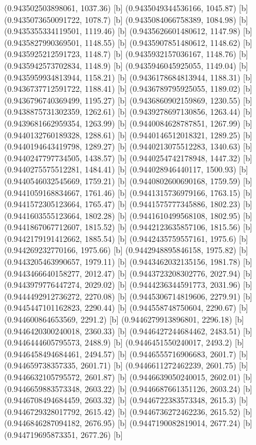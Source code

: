 {{{(0.943502503898061, 1037.36) [b] 
(0.9435049344536166, 1045.87) [b] 
(0.9435073650091722, 1078.7) [b] 
(0.9435084066758389, 1084.98) [b] 
(0.9435355334119501, 1119.46) [b] 
(0.9435626601480612, 1147.98) [b] 
(0.9435827990369501, 1148.55) [b] 
(0.9435907851480612, 1148.62) [b] 
(0.9435925212591723, 1148.7) [b] 
(0.9435932157036167, 1148.76) [b] 
(0.9435942573702834, 1148.9) [b] 
(0.9435946045925055, 1149.04) [b] 
(0.9435959934813944, 1158.21) [b] 
(0.9436178684813944, 1188.31) [b] 
(0.9436737712591722, 1188.41) [b] 
(0.9436789795925055, 1189.02) [b] 
(0.9436796740369499, 1195.27) [b] 
(0.9436860902159869, 1230.55) [b] 
(0.9438875731302359, 1262.61) [b] 
(0.9439278697130856, 1263.44) [b] 
(0.9439681662959354, 1263.99) [b] 
(0.9440084628787851, 1267.99) [b] 
(0.9440132760189328, 1288.61) [b] 
(0.9440146512018321, 1289.25) [b] 
(0.9440194643419798, 1289.27) [b] 
(0.9440213075512283, 1340.63) [b] 
(0.9440247797734505, 1438.57) [b] 
(0.9440254742178948, 1447.32) [b] 
(0.9440275575512281, 1484.41) [b] 
(0.944028946440117, 1500.93) [b] 
(0.9440546032545669, 1759.21) [b] 
(0.9440802600690168, 1759.59) [b] 
(0.9441059168834667, 1761.46) [b] 
(0.9441315736979166, 1763.15) [b] 
(0.9441572305123664, 1765.47) [b] 
(0.9441575777345886, 1802.23) [b] 
(0.9441603555123664, 1802.28) [b] 
(0.9441610499568108, 1802.95) [b] 
(0.9441867067712607, 1815.52) [b] 
(0.9442123635857106, 1815.56) [b] 
(0.9442179191412662, 1885.54) [b] 
(0.9442435759557161, 1975.6) [b] 
(0.944269232770166, 1975.66) [b] 
(0.9442948895846158, 1975.82) [b] 
(0.9443205463990657, 1979.11) [b] 
(0.9443462032135156, 1981.78) [b] 
(0.9443466640158277, 2012.47) [b] 
(0.9443723208302776, 2027.94) [b] 
(0.9443979776447274, 2029.02) [b] 
(0.9444236344591773, 2031.96) [b] 
(0.9444492912736272, 2270.08) [b] 
(0.9445306714819606, 2279.91) [b] 
(0.9445447101162823, 2290.44) [b] 
(0.944558748750604, 2290.67) [b] 
(0.944600864653569, 2291.2) [b] 
(0.9446279913896801, 2296.18) [b] 
(0.9446420300240018, 2360.33) [b] 
(0.9446427244684462, 2483.51) [b] 
(0.9446444605795573, 2488.9) [b] 
(0.9446451550240017, 2493.2) [b] 
(0.9446458494684461, 2494.57) [b] 
(0.9446555716906683, 2601.7) [b] 
(0.944659738357335, 2601.71) [b] 
(0.9446611272462239, 2601.75) [b] 
(0.9446632105795572, 2601.87) [b] 
(0.9446639050240015, 2602.01) [b] 
(0.9446659883573348, 2603.22) [b] 
(0.9446687661351126, 2603.24) [b] 
(0.9446708494684459, 2603.32) [b] 
(0.9446722383573348, 2615.3) [b] 
(0.9446729328017792, 2615.42) [b] 
(0.9446736272462236, 2615.52) [b] 
(0.9446846287094182, 2676.95) [b] 
(0.9447190082819014, 2677.24) [b] 
(0.944719695873351, 2677.26) [b] 
}}}

